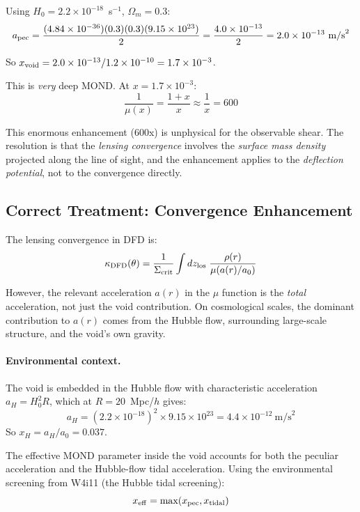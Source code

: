 \documentclass[11pt,a4paper]{article}
\newcommand{\ee}[1]{\times 10^{#1}}
\begin{document}
Using $H_0 = 2.2\ee{-18}$~s$^{-1}$, $\Omega_m = 0.3$:
\begin{equation}
a_{\rm pec} = \frac{(4.84\ee{-36})(0.3)(0.3)(9.15\ee{23})}{2}
= \frac{4.0\ee{-13}}{2} = 2.0\ee{-13}~\text{m/s}^2
\end{equation}

So $x_{\rm void} = 2.0\ee{-13}/1.2\ee{-10} = 1.7\ee{-3}$.

This is \emph{very} deep MOND.  At $x = 1.7\ee{-3}$:
\begin{equation}
\frac{1}{\mu(x)} = \frac{1+x}{x} \approx \frac{1}{x} = 600
\end{equation}

This enormous enhancement (600x) is unphysical for the observable
shear.  The resolution is that the \emph{lensing convergence} involves
the \emph{surface mass density} projected along the line of sight,
and the enhancement applies to the \emph{deflection potential}, not
to the convergence directly.

\subsection{Correct Treatment: Convergence Enhancement}

The lensing convergence in DFD is:
\begin{equation}
\kappa_{\rm DFD}(\theta) = \frac{1}{\Sigma_{\rm crit}}
\int dz_{\rm los}\; \frac{\rho(r)}{\mu(a(r)/a_0)}
\end{equation}

However, the relevant acceleration $a(r)$ in the $\mu$ function
is the \emph{total} acceleration, not just the void contribution.
On cosmological scales, the dominant contribution to $a(r)$ comes
from the Hubble flow, surrounding large-scale structure, and the
void's own gravity.

\paragraph{Environmental context.}
The void is embedded in the Hubble flow with characteristic acceleration
$a_H = H_0^2 R$, which at $R = 20$~Mpc/$h$ gives:
\begin{equation}
a_H = (2.2\ee{-18})^2 \times 9.15\ee{23} = 4.4\ee{-12}~\text{m/s}^2
\end{equation}
So $x_H = a_H/a_0 = 0.037$.

The effective MOND parameter inside the void accounts for both the
peculiar acceleration and the Hubble-flow tidal acceleration.  Using
the environmental screening from W4i11 (the Hubble tidal screening):
\begin{equation}
x_{\rm eff} = \max(x_{\rm pec}, x_{\rm tidal})
\end{equation}
\end{document}
